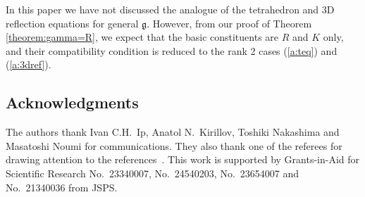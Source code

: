 \documentclass[pdftex]{sigma}
\newcommand{\geh}{\mathfrak{g}}
\begin{document}
In this paper we have not discussed
the analogue of the tetrahedron and 3D ref\/lection equations
for general $\geh$.
However, from our proof of Theorem \ref{theorem:gamma=R},
we expect that the basic constituents are
$R$ and $K$ only, and their compatibility condition
is reduced to the rank 2 cases (\ref{a:teq}) and (\ref{a:3dref}).



\subsection*{Acknowledgments}
The authors thank Ivan C.H.~Ip, Anatol N.~Kirillov,
Toshiki Nakashima and Masatoshi Noumi for communications.
They also thank one of the referees for drawing attention to the referen\-ces~\cite{Joseph, Yak}.
This work is supported by Grants-in-Aid for
Scientif\/ic Research No.~23340007, No.~24540203,
No.~23654007 and No.~21340036 from JSPS.
\end{document}
